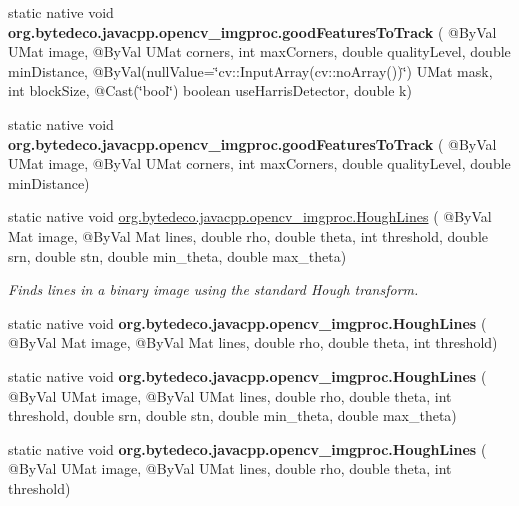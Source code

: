 \begin{DoxyCompactItemize}
static native void {\bfseries org.\+bytedeco.\+javacpp.\+opencv\+\_\+imgproc.\+good\+Features\+To\+Track} ( @By\+Val U\+Mat image, @By\+Val U\+Mat corners, int max\+Corners, double quality\+Level, double min\+Distance, @By\+Val(null\+Value=\char`\"{}cv\+::\+Input\+Array(cv\+::no\+Array())\char`\"{}) U\+Mat mask, int block\+Size, @Cast(\char`\"{}bool\char`\"{}) boolean use\+Harris\+Detector, double k)
\item 
\mbox{\label{group__imgproc__feature_ga5ef00a173eab10aa524cee009daf35fa}} 
static native void {\bfseries org.\+bytedeco.\+javacpp.\+opencv\+\_\+imgproc.\+good\+Features\+To\+Track} ( @By\+Val U\+Mat image, @By\+Val U\+Mat corners, int max\+Corners, double quality\+Level, double min\+Distance)
\item 
static native void \hyperlink{group__imgproc__feature_ga304555e089d6883caf9ac96ebef50718}{org.\+bytedeco.\+javacpp.\+opencv\+\_\+imgproc.\+Hough\+Lines} ( @By\+Val Mat image, @By\+Val Mat lines, double rho, double theta, int threshold, double srn, double stn, double min\+\_\+theta, double max\+\_\+theta)
\begin{DoxyCompactList}\small\item\em Finds lines in a binary image using the standard Hough transform. \end{DoxyCompactList}\item 
\mbox{\label{group__imgproc__feature_ga5e579ff99d29a922ebc5398e1b50d508}} 
static native void {\bfseries org.\+bytedeco.\+javacpp.\+opencv\+\_\+imgproc.\+Hough\+Lines} ( @By\+Val Mat image, @By\+Val Mat lines, double rho, double theta, int threshold)
\item 
\mbox{\label{group__imgproc__feature_gad5ec1da6fe31a01920f24db535e379f9}} 
static native void {\bfseries org.\+bytedeco.\+javacpp.\+opencv\+\_\+imgproc.\+Hough\+Lines} ( @By\+Val U\+Mat image, @By\+Val U\+Mat lines, double rho, double theta, int threshold, double srn, double stn, double min\+\_\+theta, double max\+\_\+theta)
\item 
\mbox{\label{group__imgproc__feature_ga190a7b3beae6372ac6fa6ae1f5324928}} 
static native void {\bfseries org.\+bytedeco.\+javacpp.\+opencv\+\_\+imgproc.\+Hough\+Lines} ( @By\+Val U\+Mat image, @By\+Val U\+Mat lines, double rho, double theta, int threshold)

\end{DoxyCompactItemize}
